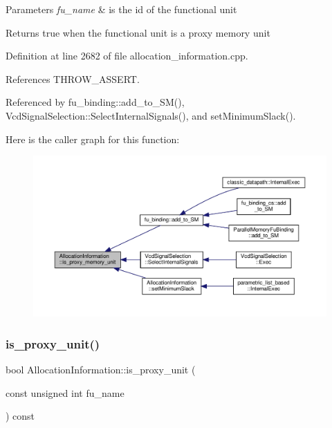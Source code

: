 \begin{DoxyParams}{Parameters}
{\em fu\+\_\+name} & is the id of the functional unit \\
\hline
\end{DoxyParams}
\begin{DoxyReturn}{Returns}
true when the functional unit is a proxy memory unit 
\end{DoxyReturn}


Definition at line 2682 of file allocation\+\_\+information.\+cpp.



References T\+H\+R\+O\+W\+\_\+\+A\+S\+S\+E\+RT.



Referenced by fu\+\_\+binding\+::add\+\_\+to\+\_\+\+S\+M(), Vcd\+Signal\+Selection\+::\+Select\+Internal\+Signals(), and set\+Minimum\+Slack().

Here is the caller graph for this function\+:
\nopagebreak
\begin{figure}[H]
\begin{center}
\leavevmode
\includegraphics[width=350pt]{d7/d79/classAllocationInformation_aaf17678cabfddb5eb558d025060a68f5_icgraph}
\end{center}
\end{figure}
\mbox{\label{classAllocationInformation_a62bd7f98935c32e3e634c27994382ed1}} 
\subsubsection{\texorpdfstring{is\+\_\+proxy\+\_\+unit()}{is\_proxy\_unit()}}
{\footnotesize\ttfamily bool Allocation\+Information\+::is\+\_\+proxy\+\_\+unit (\begin{DoxyParamCaption}\item[{const unsigned int}]{fu\+\_\+name }\end{DoxyParamCaption}) const}



